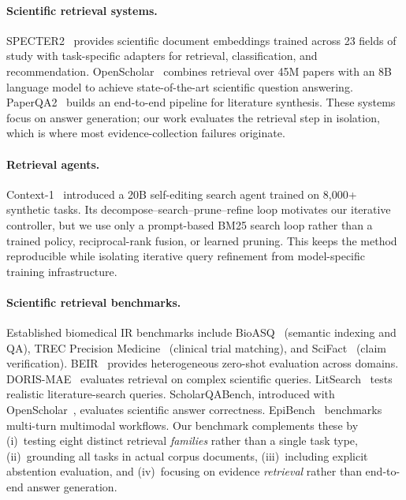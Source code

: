 \documentclass{article}
\begin{document}
\paragraph{Scientific retrieval systems.}
SPECTER2~\cite{specter2} provides scientific document embeddings trained across 23 fields of study with task-specific adapters for retrieval, classification, and recommendation. OpenScholar~\cite{openscholar2026} combines retrieval over 45M papers with an 8B language model to achieve state-of-the-art scientific question answering. PaperQA2~\cite{skarlinski2024paperqa2} builds an end-to-end pipeline for literature synthesis. These systems focus on answer generation; our work evaluates the retrieval step in isolation, which is where most evidence-collection failures originate.

\paragraph{Retrieval agents.}
Context-1~\cite{context2026} introduced a 20B self-editing search agent trained on 8,000+ synthetic tasks. Its decompose--search--prune--refine loop motivates our iterative controller, but we use only a prompt-based BM25 search loop rather than a trained policy, reciprocal-rank fusion, or learned pruning. This keeps the method reproducible while isolating iterative query refinement from model-specific training infrastructure.

\paragraph{Scientific retrieval benchmarks.}
Established biomedical IR benchmarks include BioASQ~\cite{bioasq2015} (semantic indexing and QA), TREC Precision Medicine~\cite{trecpm2017} (clinical trial matching), and SciFact~\cite{scifact2020} (claim verification). BEIR~\cite{beir2021} provides heterogeneous zero-shot evaluation across domains. DORIS-MAE~\cite{dorismae2023} evaluates retrieval on complex scientific queries. LitSearch~\cite{litsearch2024} tests realistic literature-search queries. ScholarQABench, introduced with OpenScholar~\cite{openscholar2026}, evaluates scientific answer correctness. EpiBench~\cite{epibench2026} benchmarks multi-turn multimodal workflows. Our benchmark complements these by (i)~testing eight distinct retrieval \emph{families} rather than a single task type, (ii)~grounding all tasks in actual corpus documents, (iii)~including explicit abstention evaluation, and (iv)~focusing on evidence \emph{retrieval} rather than end-to-end answer generation.
\end{document}
